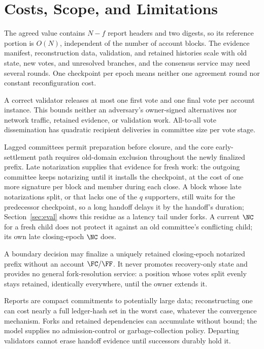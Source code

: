 \section{Costs, Scope, and Limitations}
\label{sec:costs}
The agreed value contains $N-f$ report headers and two digests, so its reference portion is $O(N)$, independent of the number of account blocks. The evidence manifest, reconstruction data, validation, and retained histories scale with old state, new votes, and unresolved branches, and the consensus service may need several rounds. One checkpoint per epoch means neither one agreement round nor constant reconfiguration cost.

A correct validator releases at most one first vote and one final vote per account instance. This bounds neither an adversary's owner-signed alternatives nor network traffic, retained evidence, or validation work. All-to-all vote dissemination has quadratic recipient deliveries in committee size per vote stage.

Lagged committees permit preparation before closure, and the core early-settlement path requires old-domain exclusion throughout the newly finalized prefix. Late notarization supplies that evidence for fresh work: the outgoing committee keeps notarizing until it installs the checkpoint, at the cost of one more signature per block and member during each close. A block whose late notarizations split, or that lacks one of the $q$ supporters, still waits for the predecessor checkpoint, so a long handoff delays it by the handoff's duration; Section~\ref{sec:eval} shows this residue as a latency tail under forks. A current $\NC$ for a fresh child does not protect it against an old committee's conflicting child; its own late closing-epoch $\NC$ does.

A boundary decision may finalize a uniquely retained closing-epoch notarized prefix without an account $\FC/\FF$. It never promotes recovery-only state and provides no general fork-resolution service: a position whose votes split evenly stays retained, identically everywhere, until the owner extends it.

Reports are compact commitments to potentially large data; reconstructing one can cost nearly a full ledger-hash set in the worst case, whatever the convergence mechanism. Forks and retained dependencies can accumulate without bound; the model supplies no admission-control or garbage-collection policy. Departing validators cannot erase handoff evidence until successors durably hold it.

